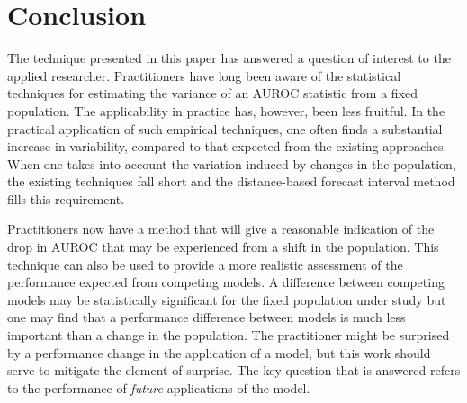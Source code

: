 

\section{Conclusion}



%
%


The technique presented in this paper has answered a question of interest to the applied researcher.
Practitioners have long been aware of the statistical techniques for estimating the variance of an AUROC statistic from a fixed population.
The applicability in practice has, however, been less fruitful.
In the practical application of such empirical techniques, one often finds a substantial increase in variability, compared to that expected from the existing approaches.
When one takes into account the variation induced by changes in the population, the existing techniques fall short and the distance-based forecast interval method
fills this requirement.

Practitioners now have a method that will give a reasonable indication of the drop in AUROC that may be experienced from a shift in the population.
This technique can also be used to provide a more realistic assessment of the performance expected from competing models.
A difference between competing models may be statistically significant for the fixed population under study but one may find that a performance difference between models is much less important than a change in the population.
The practitioner might be surprised by a performance change in the application of a model, but this work should serve to mitigate the element of surprise.
The key question that is answered refers to the performance of \emph{future} applications of the model.


